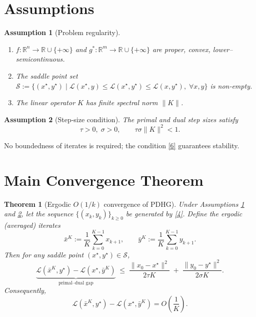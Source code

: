 \documentclass{article}
\newtheorem{theorem}{Theorem}
\newtheorem{assumption}{Assumption}
\begin{document}
\section*{Assumptions}
\begin{assumption}[Problem regularity]
\label{ass:regular}
\begin{enumerate}[label=(\alph*)]
\item $f:\mathbb{R}^{n}\to\mathbb{R}\cup\{+\infty\}$ and $g^{*}:\mathbb{R}^{m}\to\mathbb{R}\cup\{+\infty\}$ are proper, convex, lower–semicontinuous.
\item The saddle point set $\mathcal{S}:=\{(x^{\star},y^{\star})\mid
\mathcal{L}(x^{\star},y)\le \mathcal{L}(x^{\star},y^{\star})\le\mathcal{L}(x,y^{\star}),\;\forall x,y\}$ is non‑empty.
\item The linear operator $K$ has finite spectral norm $\|K\|$.
\end{enumerate}
\end{assumption}

\begin{assumption}[Step‑size condition]
\label{ass:stepsize}
The primal and dual step sizes satisfy
\[
\tau>0,\;\sigma>0,\qquad \tau\sigma\|K\|^{2}<1.
\tag{6}
\]
\end{assumption}

No boundedness of iterates is required; the condition \eqref{6} guarantees stability.

\section*{Main Convergence Theorem}
\begin{theorem}[Ergodic $O(1/k)$ convergence of PDHG]
\label{thm:main}
Under Assumptions \ref{ass:regular} and \ref{ass:stepsize}, let the sequence $\{(x_{k},y_{k})\}_{k\ge0}$ be generated by \eqref{4}. Define the ergodic (averaged) iterates
\[
\bar{x}^{K}:=\frac{1}{K}\sum_{k=0}^{K-1}x_{k+1},
\qquad
\bar{y}^{K}:=\frac{1}{K}\sum_{k=0}^{K-1}y_{k+1}.
\tag{7}
\]
Then for any saddle point $(x^{\star},y^{\star})\in\mathcal{S}$,
\[
\underbrace{\mathcal{L}(\bar{x}^{K},y^{\star})-\mathcal{L}(x^{\star},\bar{y}^{K})}_{\text{primal–dual gap}}
\;\le\;
\frac{\|x_{0}-x^{\star}\|^{2}}{2\tau K}
\;+\;
\frac{\|y_{0}-y^{\star}\|^{2}}{2\sigma K}.
\tag{8}
\]
Consequently,
\[
\mathcal{L}(\bar{x}^{K},y^{\star})-\mathcal{L}(x^{\star},\bar{y}^{K}) = O\!\left(\frac{1}{K}\right).
\]
\end{theorem}
\end{document}

